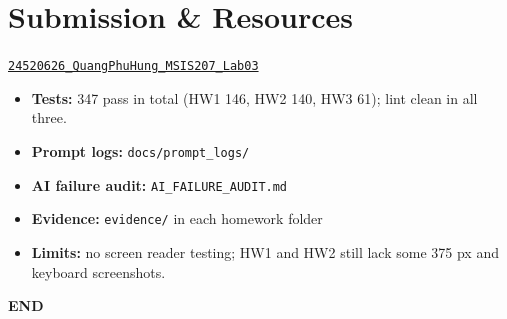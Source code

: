 \chapter{Submission \& Resources}
\label{chap:submission-resources}

\begin{center}
    \href{https://github.com/Prosperum26/24520626_QuangPhuHung_MSIS207_Lab03}
    {\texttt{24520626\_QuangPhuHung\_MSIS207\_Lab03}}
\end{center}

\begin{itemize}
    \item \textbf{Tests:} 347 pass in total (HW1 146, HW2 140, HW3 61); lint clean in all three.
    \item \textbf{Prompt logs:} \texttt{docs/prompt\_logs/}
    \item \textbf{AI failure audit:} \texttt{AI\_FAILURE\_AUDIT.md}
    \item \textbf{Evidence:} \texttt{evidence/} in each homework folder
    \item \textbf{Limits:} no screen reader testing; HW1 and HW2 still lack some 375 px and keyboard screenshots.
\end{itemize}

\begin{center}
\textbf{END}
\end{center}
